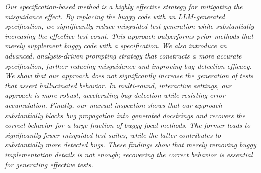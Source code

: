 \documentclass[acmsmall]{acmart}
\begin{document}
\begin{tcolorbox}[
    colback=black!5,
    colframe=black!20,
    boxrule=1pt,
    arc=2mm,
    title=RQ2 Answer,
    halign title=center,
    fonttitle=\bfseries\small,
    boxsep=1pt,
    left=3pt,
    right=3pt,
    top=3pt,
    bottom=3pt,
    toptitle=1pt,
    bottomtitle=1pt,
    lefttitle=3pt,
    righttitle=3pt,
]
\textit{Our specification-based method is a highly effective strategy for mitigating the misguidance effect. By replacing the buggy code with an LLM-generated specification, we significantly reduce misguided test generation while substantially increasing the effective test count. This approach outperforms prior methods that merely supplement buggy code with a specification. We also introduce an advanced, analysis-driven prompting strategy that constructs a more accurate specification, further reducing misguidance and improving bug detection efficacy. We show that our approach does not significantly increase the generation of tests that assert hallucinated behavior. In multi-round, interactive settings, our approach is more robust, accelerating bug detection while resisting error accumulation. Finally, our manual inspection shows that our approach substantially blocks bug propagation into generated docstrings and recovers the correct behavior for a large fraction of buggy focal methods. The former leads to significantly fewer misguided test suites, while the latter contributes to substantially more detected bugs. These findings show that merely removing buggy implementation details is not enough; recovering the correct behavior is essential for generating effective tests.}
\end{tcolorbox}




\end{document}
